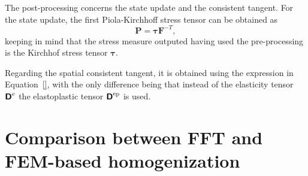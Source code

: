 The post-processing concerns the state update and the consistent tangent.
For the state update, the first Piola-Kirchhoff stress tensor can be obtained as
\begin{equation}
\bm P = \bm \tau \bm F^{-T},
\end{equation}
keeping in mind that the stress measure outputed having used the pre-processing is the Kirchhof stress tensor \(\bm \tau\).

Regarding the spatial consistent tangent, it is obtained using the expression in Equation~\eqref{}, with the only difference being that instead of the elasticity tensor \(\boldsymbol{\mathsf{D}}^e\) the elastoplastic tensor \(\boldsymbol{\mathsf{D}}^\text{ep}\) is used.

\section{Comparison between FFT and FEM-based homogenization}


